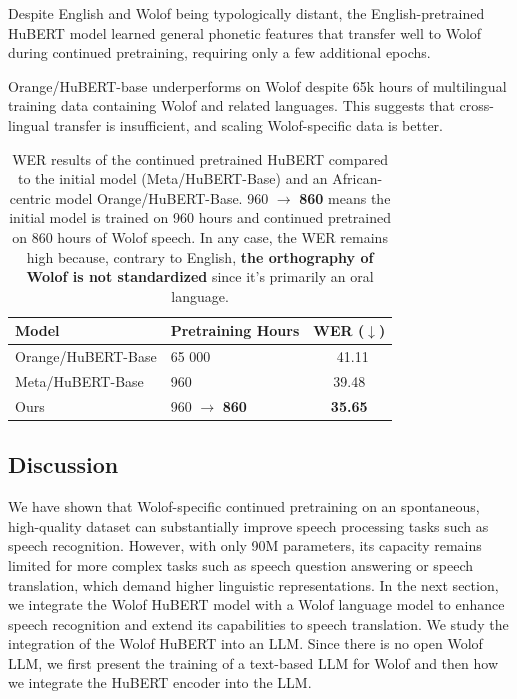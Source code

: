 \documentclass{article}
\begin{document}
\begin{tcolorbox}[colback=violet!15!white,colframe=violet!100!white,title={\color{black} \textbf{Insight 1}: Phonetic features transfer well across distant languages for continued pretraining} ]
    Despite English and Wolof being typologically distant, the English-pretrained HuBERT model learned general phonetic features that transfer well to Wolof during continued pretraining, requiring only a few additional epochs.
\end{tcolorbox}

\begin{tcolorbox}[colback=violet!15!white,colframe=violet!100!white,title={\color{black} \textbf{Insight 2}: Don't rely on multilingualism only, scale the monolingual dataset} ]
    Orange/HuBERT-base underperforms on Wolof despite 65k hours of multilingual training data containing Wolof and related languages. This suggests that cross-lingual transfer is insufficient, and scaling Wolof-specific data is better.
\end{tcolorbox}
\begin{table}[ht]
    \centering
    \begin{tabular}{llc}
        \toprule
        \textbf{Model} & \textbf{Pretraining Hours} & \textbf{WER} ($\downarrow$) \\
        \midrule
        Orange/HuBERT-Base & 65 000 & \ 41.11 \\
        Meta/HuBERT-Base & 960 & 39.48 \\
        \rowcolor[HTML]{EEE0CC} Ours & 960 $\rightarrow$ \textbf{860} & \textbf{35.65} \\
        \bottomrule
    \end{tabular}
    \caption{WER results of the continued pretrained HuBERT compared to the initial model (Meta/HuBERT-Base) and an African-centric model Orange/HuBERT-Base. 960 $\rightarrow$ \textbf{860} means the initial model is trained on 960 hours and continued pretrained on 860 hours of Wolof speech. In any case, the WER remains high because, contrary to English, \textbf{the orthography of Wolof is not standardized} since it's primarily an oral language.}
    \label{tab:wer}
\end{table}
\subsection{Discussion}
We have shown that Wolof-specific continued pretraining on an spontaneous, high-quality dataset can substantially improve speech processing tasks such as speech recognition. However, with only 90M parameters, its capacity remains limited for more complex tasks such as speech question answering or speech translation, which demand higher linguistic representations. In the next section, we integrate the Wolof HuBERT model with a Wolof language model to enhance speech recognition and extend its capabilities to speech translation. We study the integration of the Wolof HuBERT into an LLM. Since there is no open Wolof LLM, we first present the training of a text-based LLM for Wolof and then how we integrate the HuBERT encoder into the LLM.
\end{document}
